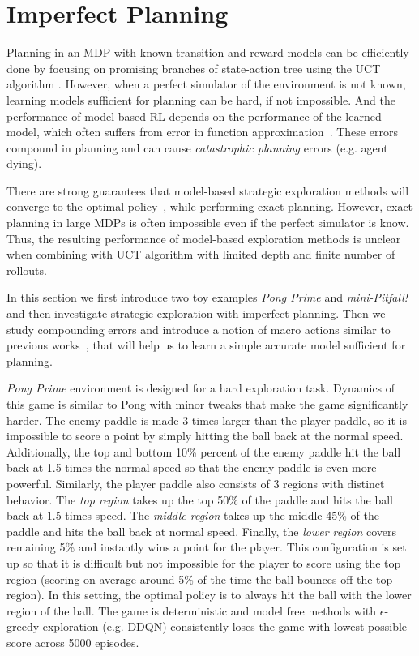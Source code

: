 \section{Imperfect Planning}\label{sec:imperfect_plan}
Planning in an MDP with known transition and reward models can be efficiently done by focusing on promising branches of state-action tree using the UCT algorithm \citep{kocsis2006bandit}. However, when a perfect simulator of the environment is not known, learning models sufficient for planning can be hard, if not impossible. And the performance of model-based RL depends on the performance of the learned model, which often suffers from error in function approximation~\citep{talvitie2015agnostic, talvitie2014model}. These errors compound in planning and can cause \textit{catastrophic planning} errors (e.g. agent dying).

There are strong guarantees that model-based strategic exploration methods will converge to the optimal policy~\citep{brafman2002r, thompson1933likelihood, guez2012efficient}, while performing exact planning. However, exact planning in large MDPs is often impossible even if the perfect simulator is know. Thus, the resulting performance of model-based exploration methods is unclear when combining with UCT algorithm with limited depth and finite number of rollouts. 

In this section we first introduce two toy examples \textit{Pong Prime} and \textit{mini-Pitfall!} and then investigate strategic exploration with imperfect planning. Then we study compounding errors and introduce a notion of macro actions similar to previous works~\citep{diuk2008object}, that will help us to learn a simple accurate model sufficient for planning.

\textit{Pong Prime} environment is designed for a hard exploration task. Dynamics of this game is similar to Pong with minor tweaks that make the game significantly harder. The enemy paddle is made 3 times larger than the player paddle, so it is impossible to score a point by simply hitting the ball back at the normal speed.  Additionally, the top and bottom 10\% percent of the enemy paddle hit the ball back at 1.5 times the normal speed so that the enemy paddle is even more powerful. Similarly, the player paddle also consists of 3 regions with distinct behavior. The \emph{top region} takes up the top 50\% of the paddle and hits the ball back at 1.5 times speed. The \emph{middle region} takes up the middle 45\% of the paddle and hits the ball back at normal speed. Finally, the \emph{lower region} covers remaining 5\% and instantly wins a point for the player. This configuration is set up so that it is difficult but not impossible for the player to score using the top region (scoring on average around 5\% of the time the ball bounces off the top region). In this setting, the optimal policy is to always hit the ball with the lower region of the ball. The game is deterministic and model free methods with $\epsilon$-greedy exploration (e.g. DDQN) consistently loses the game with lowest possible score across 5000 episodes.

